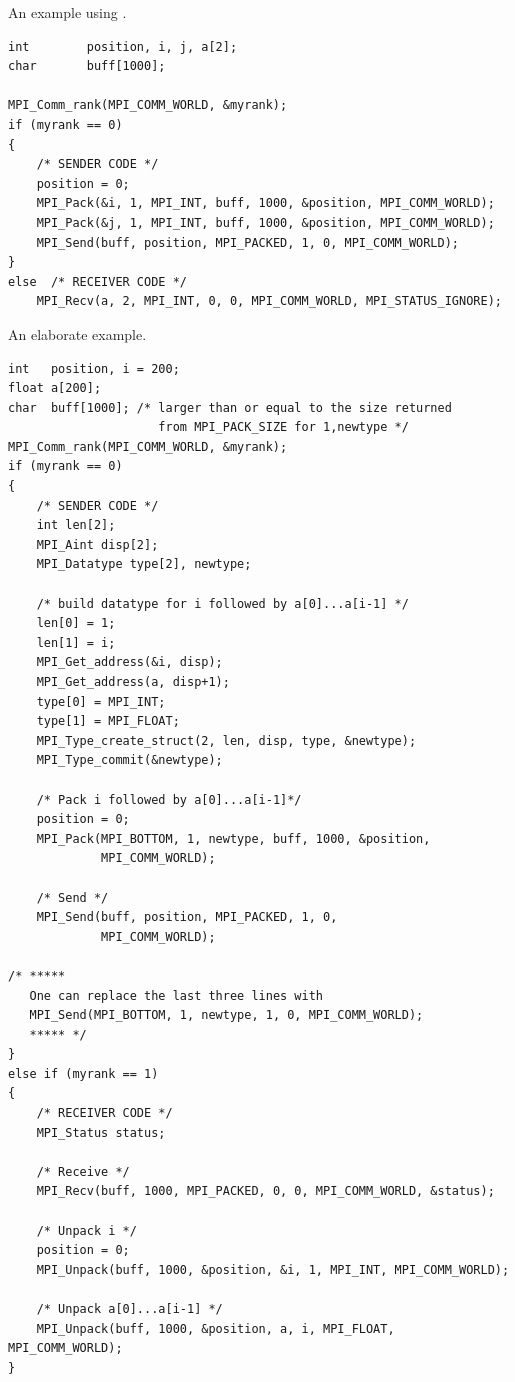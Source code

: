 \begin{example}
\label{pt2pt-exJJ}
%
An example using .
\begin{lstlisting}[language={[MPI]C}]
int        position, i, j, a[2];
char       buff[1000];

MPI_Comm_rank(MPI_COMM_WORLD, &myrank);
if (myrank == 0)
{
    /* SENDER CODE */
    position = 0;
    MPI_Pack(&i, 1, MPI_INT, buff, 1000, &position, MPI_COMM_WORLD);
    MPI_Pack(&j, 1, MPI_INT, buff, 1000, &position, MPI_COMM_WORLD);
    MPI_Send(buff, position, MPI_PACKED, 1, 0, MPI_COMM_WORLD);
}
else  /* RECEIVER CODE */
    MPI_Recv(a, 2, MPI_INT, 0, 0, MPI_COMM_WORLD, MPI_STATUS_IGNORE);
\end{lstlisting}
\end{example}



\begin{example}
\label{pt2pt-exKK}
%
%
An elaborate example.
\begin{lstlisting}[language={[MPI]C}]
int   position, i = 200;
float a[200];
char  buff[1000]; /* larger than or equal to the size returned
                     from MPI_PACK_SIZE for 1,newtype */
MPI_Comm_rank(MPI_COMM_WORLD, &myrank);
if (myrank == 0)
{
    /* SENDER CODE */
    int len[2];
    MPI_Aint disp[2];
    MPI_Datatype type[2], newtype;

    /* build datatype for i followed by a[0]...a[i-1] */
    len[0] = 1;
    len[1] = i;
    MPI_Get_address(&i, disp);
    MPI_Get_address(a, disp+1);
    type[0] = MPI_INT;
    type[1] = MPI_FLOAT;
    MPI_Type_create_struct(2, len, disp, type, &newtype);
    MPI_Type_commit(&newtype);

    /* Pack i followed by a[0]...a[i-1]*/
    position = 0;
    MPI_Pack(MPI_BOTTOM, 1, newtype, buff, 1000, &position,
             MPI_COMM_WORLD);

    /* Send */
    MPI_Send(buff, position, MPI_PACKED, 1, 0,
             MPI_COMM_WORLD);

/* *****
   One can replace the last three lines with
   MPI_Send(MPI_BOTTOM, 1, newtype, 1, 0, MPI_COMM_WORLD);
   ***** */
}
else if (myrank == 1)
{
    /* RECEIVER CODE */
    MPI_Status status;

    /* Receive */
    MPI_Recv(buff, 1000, MPI_PACKED, 0, 0, MPI_COMM_WORLD, &status);

    /* Unpack i */
    position = 0;
    MPI_Unpack(buff, 1000, &position, &i, 1, MPI_INT, MPI_COMM_WORLD);

    /* Unpack a[0]...a[i-1] */
    MPI_Unpack(buff, 1000, &position, a, i, MPI_FLOAT, MPI_COMM_WORLD);
}
\end{lstlisting}
\end{example}

